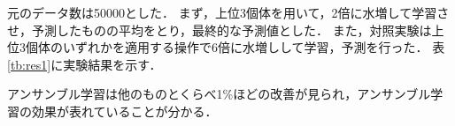 \documentclass[twocolumn]{jarticle}     %
\begin{document}
\begin{table}[h]
	\centering
	\caption{学習パラメータ\label{tb:param2}}
\end{table}
元のデータ数は50000とした．
まず，上位3個体を用いて，2倍に水増して学習させ，予測したものの平均をとり，最終的な予測値とした．
また，対照実験は上位3個体のいずれかを適用する操作で6倍に水増しして学習，予測を行った．
表\ref{tb:res1}に実験結果を示す．\\
\begin{table}[h]
	\centering
	\caption{実験結果\label{tb:res1}}
\end{table}
アンサンブル学習は他のものとくらべ1\%ほどの改善が見られ，アンサンブル学習の効果が表れていることが分かる．\\ \\
\end{document}
